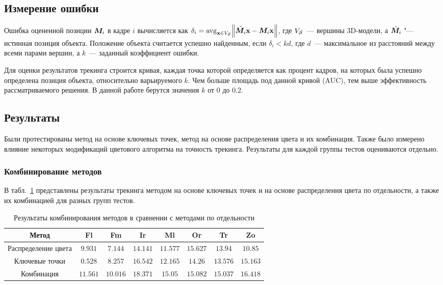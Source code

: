 \subsection{Измерение ошибки}

Ошибка оцененной позиции $\bm{M}_i$ в кадре $i$ вычисляется как
$
\delta_i = \operatorname*{avg}_{\mathbf{x} \in V_{\mathcal{S}}} \norm{\hat{\bm{M}_i} \mathbf{x} - \bm{M}_i
\mathbf{x}}
$,
где $V_{\mathcal{S}}$~--- вершины 3D-модели,
а $\hat{\bm{M}_i}$ "--- истинная позиция объекта.
Положение объекта считается успешно найденным, если $\delta_i < k d$, где
$d$~--- максимальное из расстояний между всеми парами вершин, а $k$~---
заданный коэффициент ошибки.

Для оценки результатов трекинга строится кривая, каждая точка которой
определяется как процент кадров, на которых была успешно определена позиция
объекта, относительно варьируемого $k$.
Чем больше площадь под данной кривой (AUC), тем выше эффективность
рассматриваемого решения.
В данной работе берутся значения $k$ от 0 до 0.2.

\subsection{Результаты}
Были протестированы метод на основе ключевых точек, метод на основе
распределения цвета и их комбинация.
Также было измерено влияние некоторых модификаций цветового алгоритма на точность трекинга.
Результаты для каждой группы тестов оцениваются отдельно.

\subsubsection{Комбинирование методов}

В табл.~\ref{tab:combine} представлены результаты трекинга методом на основе ключевых точек и на основе распределения цвета по отдельности, а также их комбинацией для разных групп тестов.

\begin{table}[h]
\caption{\label{tab:combine}Результаты комбинирования методов в сравнении с методами по отдельности}
\begin{center}
\begin{tabular}{|c|c|c|c|c|c|c|c|}
\hline
Метод                        & Fl           & Fm          & Ir            & Ml           & Or           & Tr          & Zo  \\
\hline
Распределение цвета & $9.931$  & $7.144$   & $14.141$ & $11.577$ & $15.627$ & $13.94$  & $10.85$ \\
\hline
Ключевые точки        & $0.528$  & $8.257$   & $16.542$ & $12.165$ & $14.26$   & $13.576$ & $15.163$ \\
\hline
Комбинация               & $11.561$ & $10.016$ & $18.371$ & $15.05$  & $15.082$  & $15.037$ & $16.418$ \\
\hline
\end{tabular}
\end{center}
\end{table}

